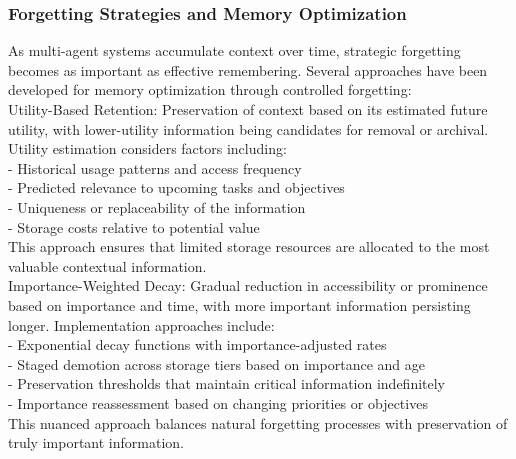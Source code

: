 \subsubsection{Forgetting Strategies and Memory Optimization}
As multi-agent systems accumulate context over time, strategic forgetting becomes as important as effective remembering. Several approaches have been developed for memory optimization through controlled forgetting:\\ \newline
Utility-Based Retention: Preservation of context based on its estimated future utility, with lower-utility information being candidates for removal or archival. Utility estimation considers factors including:\\ \newline
- Historical usage patterns and access frequency\\ \newline
- Predicted relevance to upcoming tasks and objectives\\ \newline
- Uniqueness or replaceability of the information\\ \newline
- Storage costs relative to potential value\\ \newline
This approach ensures that limited storage resources are allocated to the most valuable contextual information.\\ \newline
Importance-Weighted Decay: Gradual reduction in accessibility or prominence based on importance and time, with more important information persisting longer. Implementation approaches include:\\ \newline
- Exponential decay functions with importance-adjusted rates\\ \newline
- Staged demotion across storage tiers based on importance and age\\ \newline
- Preservation thresholds that maintain critical information indefinitely\\ \newline
- Importance reassessment based on changing priorities or objectives\\ \newline
This nuanced approach balances natural forgetting processes with preservation of truly important information.\\ \newline
